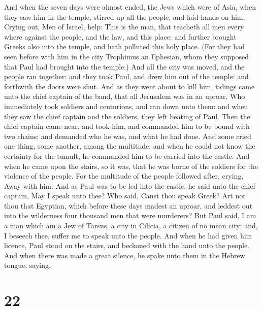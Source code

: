  And when the seven days were almost ended, the Jews which
were of Asia, when they saw him in the temple, stirred up all the
people, and laid hands on him,  Crying out, Men of Israel,
help: This is the man, that teacheth all men every where against the
people, and the law, and this place: and further brought Greeks also
into the temple, and hath polluted this holy place.  (For
they had seen before with him in the city Trophimus an Ephesian, whom
they supposed that Paul had brought into the temple.)  And
all the city was moved, and the people ran together: and they took Paul,
and drew him out of the temple: and forthwith the doors were shut.
 And as they went about to kill him, tidings came unto the
chief captain of the band, that all Jerusalem was in an uproar.
 Who immediately took soldiers and centurions, and ran down
unto them: and when they saw the chief captain and the soldiers, they
left beating of Paul.  Then the chief captain came near,
and took him, and commanded him to be bound with two chains; and
demanded who he was, and what he had done.  And some cried
one thing, some another, among the multitude: and when he could not know
the certainty for the tumult, he commanded him to be carried into the
castle.  And when he came upon the stairs, so it was, that
he was borne of the soldiers for the violence of the people.
 For the multitude of the people followed after, crying,
Away with him.  And as Paul was to be led into the castle,
he said unto the chief captain, May I speak unto thee? Who said, Canst
thou speak Greek?  Art not thou that Egyptian, which before
these days madest an uproar, and leddest out into the wilderness four
thousand men that were murderers?  But Paul said, I am a
man which am a Jew of Tarsus, a city in Cilicia, a citizen of no mean
city: and, I beseech thee, suffer me to speak unto the people.
 And when he had given him licence, Paul stood on the
stairs, and beckoned with the hand unto the people. And when there was
made a great silence, he spake unto them in the Hebrew tongue, saying,

\hypertarget{section-21}{%
\section{22}\label{section-21}}

